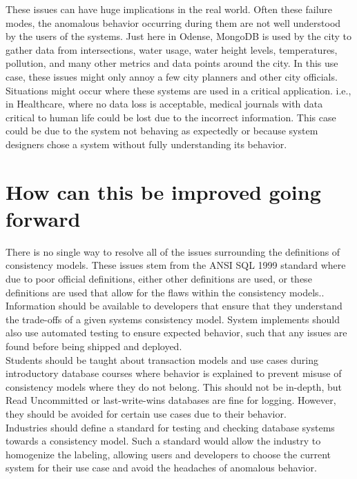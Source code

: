 \documentclass[a4paper,10pt,titlepage]{report}
\begin{document}
These issues can have huge implications in the real world. Often these failure modes, the anomalous behavior occurring during them are not well understood by the users of the systems. Just here in Odense, MongoDB is used by the city to gather data from intersections, water usage, water height levels, temperatures, pollution, and many other metrics and data points around the city. In this use case, these issues might only annoy a few city planners and other city officials. Situations might occur where these systems are used in a critical application. i.e., in Healthcare, where no data loss is acceptable, medical journals with data critical to human life could be lost due to the incorrect information. This case could be due to the system not behaving as expectedly or because system designers chose a system without fully understanding its behavior.

\section{How can this be improved going forward}

There is no single way to resolve all of the issues surrounding the definitions of consistency models. These issues stem from the ANSI SQL 1999 \cite{ansisql1999} standard where due to poor official definitions, either other definitions are used, or these definitions are used that allow for the flaws within the consistency models.. Information should be available to developers that ensure that they understand the trade-offs of a given systems consistency model. System implements should also use automated testing to ensure expected behavior, such that any issues are found before being shipped and deployed. \\
\vspace{5mm}
Students should be taught about transaction models and use cases during introductory database courses where behavior is explained to prevent misuse of consistency models where they do not belong. This should not be in-depth, but Read Uncommitted or last-write-wins databases are fine for logging. However, they should be avoided for certain use cases due to their behavior.\\
\vspace{5mm}
Industries should define a standard for testing and checking database systems towards a consistency model. Such a standard would allow the industry to homogenize the labeling, allowing users and developers to choose the current system for their use case and avoid the headaches of anomalous behavior.
\end{document}
